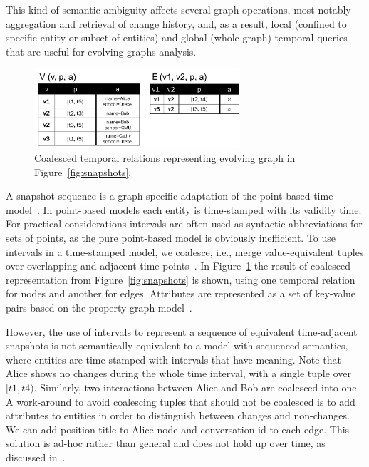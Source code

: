 This kind of semantic ambiguity affects several graph operations, most
notably aggregation and retrieval of change history, and, as a result,
local (confined to specific entity or subset of entities) and global
(whole-graph) temporal queries that are useful for evolving graphs
analysis.

\begin{figure}[t]
\vspace{-1cm}
\includegraphics[width=3in]{figs/T1_relations.pdf}
\vspace{-0.2cm}
\caption{Coalesced temporal relations representing evolving graph in Figure~\ref{fig:snapshots}.}
\vspace{-0.5cm}
\label{fig:coalesced}
\end{figure}

A snapshot sequence is a graph-specific adaptation of the point-based
time model~\cite{Toman2009}.  In point-based models each entity is
time-stamped with its validity time.  For practical considerations
intervals are often used as syntactic abbreviations for sets of
points, as the pure point-based model is obviously inefficient.  To
use intervals in a time-stamped model, we coalesce, i.e., merge
value-equivalent tuples over overlapping and adjacent time
points~\cite{Bohlen09}.  In Figure~\ref{fig:coalesced} the result of
coalesced representation from Figure~\ref{fig:snapshots} is shown,
using one temporal relation for nodes and another for edges.
Attributes are represented as a set of key-value pairs based on the
property graph model~\cite{Angles2008}.

However, the use of intervals to represent a sequence of equivalent
time-adjacent snapshots is not semantically equivalent to a model with
sequenced semantics, where entities are time-stamped with intervals
that have meaning.  Note that Alice shows no changes during the whole
time interval, with a single tuple over $[t1, t4)$.  Similarly, two
  interactions between Alice and Bob are coalesced into one.  A
  work-around to avoid coalescing tuples that should not be coalesced
  is to add attributes to entities in order to distinguish between
  changes and non-changes.  We can add position title to Alice node
  and conversation id to each edge.  This solution is ad-hoc rather
  than general and does not hold up over time, as discussed
  in~\cite{Bohlen1998}.

